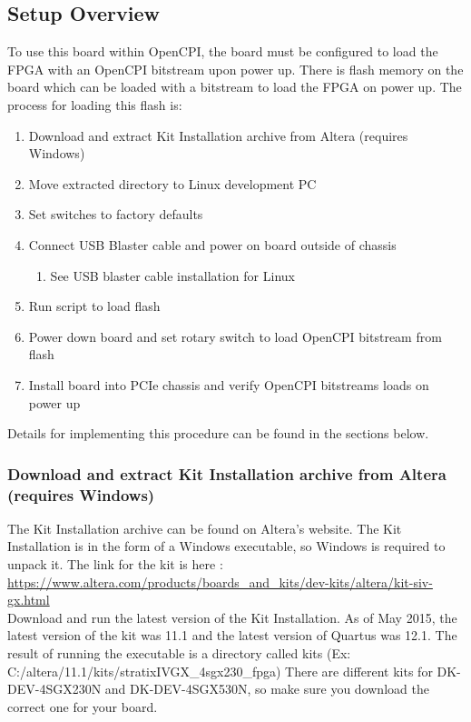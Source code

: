 \documentclass{article}
\begin{document}
\subsection*{Setup Overview}
 To use this board within OpenCPI, the board must be configured to load the FPGA with an OpenCPI bitstream upon power up. There is flash memory on the board which can be loaded with a bitstream to load the FPGA on power up. The process for loading this flash is:
\begin{enumerate}
\item Download and extract Kit Installation archive from Altera (requires Windows)
\item Move extracted directory to Linux development PC
\item Set switches to factory defaults
\item Connect USB Blaster cable and power on board outside of chassis
\begin{enumerate} \item See USB blaster cable installation for Linux \end{enumerate}
\item Run script to load flash
\item Power down board and set rotary switch to load OpenCPI bitstream from flash
\item Install board into PCIe chassis and verify OpenCPI bitstreams loads on power up
\end{enumerate}
 Details for implementing this procedure can be found in the sections below.
\subsubsection*{Download and extract Kit Installation archive from Altera (requires Windows)}
The Kit Installation archive can be found on Altera's website. The Kit Installation is in the form of a Windows executable, so Windows is required to unpack it. The link for the kit is here :\\\medskip
\url{​https://www.altera.com/products/boards_and_kits/dev-kits/altera/kit-siv-gx.html} \\\medskip
Download and run the latest version of the Kit Installation. As of May 2015, the latest version of the kit was 11.1 and the latest version of Quartus was 12.1. The result of running the executable is a directory called kits (Ex: C:/altera/11.1/kits/stratixIVGX\_4sgx230\_fpga) There are different kits for DK-DEV-4SGX230N and DK-DEV-4SGX530N, so make sure you download the correct one for your board.
\end{document}
